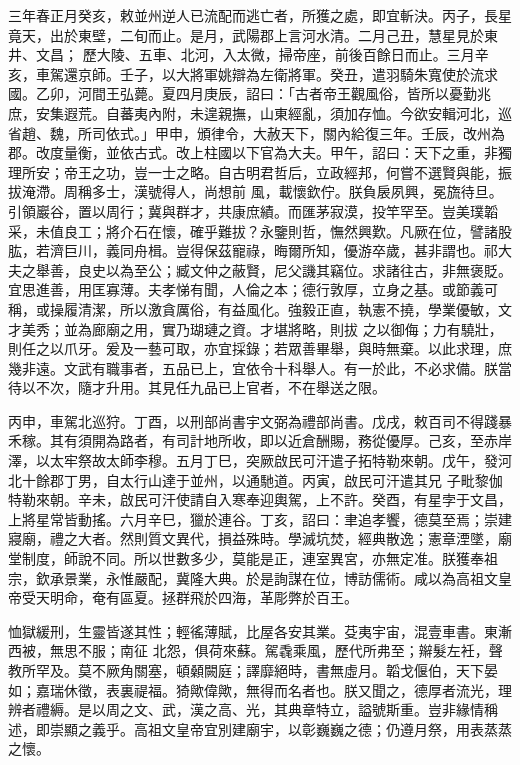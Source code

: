 \begin{pinyinscope}
 三年春正月癸亥，敕並州逆人已流配而逃亡者，所獲之處，即宜斬決。丙子，長星竟天，出於東壁，二旬而止。是月，武陽郡上言河水清。二月己丑，慧星見於東井、文昌；
 歷大陵、五車、北河，入太微，掃帝座，前後百餘日而止。三月辛亥，車駕還京師。壬子，以大將軍姚辯為左衛將軍。癸丑，遣羽騎朱寬使於流求國。乙卯，河間王弘薨。夏四月庚辰，詔曰：「古者帝王觀風俗，皆所以憂勤兆庶，安集遐荒。自蕃夷內附，未遑親撫，山東經亂，須加存恤。今欲安輯河北，巡省趙、魏，所司依式。」甲申，頒律令，大赦天下，關內給復三年。壬辰，改州為郡。改度量衡，並依古式。改上柱國以下官為大夫。甲午，詔曰：天下之重，非獨理所安；帝王之功，豈一士之略。自古明君哲后，立政經邦，何嘗不選賢與能，振拔淹滯。周稱多士，漢號得人，尚想前
 風，載懷欽佇。朕負扆夙興，冕旒待旦。引領巖谷，置以周行；冀與群才，共康庶績。而匯茅寂漠，投竿罕至。豈美璞韜采，未值良工；將介石在懷，確乎難拔？永鑒則哲，憮然興歎。凡厥在位，譬諸股肱，若濟巨川，義同舟楫。豈得保茲寵祿，晦爾所知，優游卒歲，甚非謂也。祁大夫之舉善，良史以為至公；臧文仲之蔽賢，尼父譏其竊位。求諸往古，非無褒貶。宜思進善，用匡寡薄。夫孝悌有聞，人倫之本；德行敦厚，立身之基。或節義可稱，或操履清潔，所以激貪厲俗，有益風化。強毅正直，執憲不撓，學業優敏，文才美秀；並為廊廟之用，實乃瑚璉之資。才堪將略，則拔
 之以御侮；力有驍壯，則任之以爪牙。爰及一藝可取，亦宜採錄；若眾善畢舉，與時無棄。以此求理，庶幾非遠。文武有職事者，五品已上，宜依令十科舉人。有一於此，不必求備。朕當待以不次，隨才升用。其見任九品已上官者，不在舉送之限。



 丙申，車駕北巡狩。丁酉，以刑部尚書宇文弼為禮部尚書。戊戌，敕百司不得踐暴禾稼。其有須開為路者，有司計地所收，即以近倉酬賜，務從優厚。己亥，至赤岸澤，以太牢祭故太師李穆。五月丁巳，突厥啟民可汗遣子拓特勒來朝。戊午，發河北十餘郡丁男，自太行山達于並州，以通馳道。丙寅，啟民可汗遣其兄
 子毗黎伽特勒來朝。辛未，啟民可汗使請自入寒奉迎輿駕，上不許。癸酉，有星孛于文昌，上將星常皆動搖。六月辛巳，獵於連谷。丁亥，詔曰：聿追孝饗，德莫至焉；崇建寢廟，禮之大者。然則質文異代，損益殊時。學滅坑焚，經典散逸；憲章湮墜，廟堂制度，師說不同。所以世數多少，莫能是正，連室異宮，亦無定准。朕獲奉祖宗，欽承景業，永惟嚴配，冀隆大典。於是詢謀在位，博訪儒術。咸以為高祖文皇帝受天明命，奄有區夏。拯群飛於四海，革彫弊於百王。



 恤獄緩刑，生靈皆遂其性；輕徭薄賦，比屋各安其業。芟夷宇宙，混壹車書。東漸西被，無思不服；南征
 北怨，俱荷來蘇。駕毳乘風，歷代所弗至；辮髮左衽，聲教所罕及。莫不厥角關塞，頓顙闕庭；譯靡絕時，書無虛月。韜戈偃伯，天下晏如；嘉瑞休徵，表裏禔福。猗歟偉歟，無得而名者也。朕又聞之，德厚者流光，理辨者禮縟。是以周之文、武，漢之高、光，其典章特立，謚號斯重。豈非緣情稱述，即崇顯之義乎。高祖文皇帝宜別建廟宇，以彰巍巍之德；仍遵月祭，用表蒸蒸之懷。




\end{pinyinscope}
